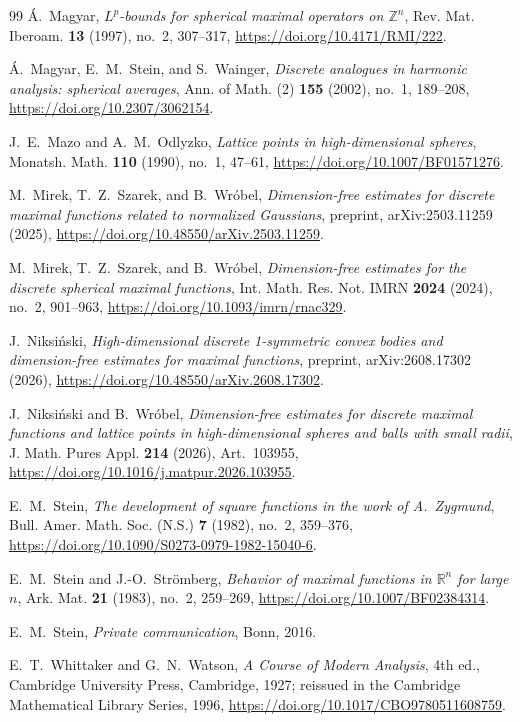 \documentclass{article}
\theoremstyle{plain}
\numberwithin{equation}{section}
\begin{document}
\begin{thebibliography}{99}
\'A.~Magyar,
\emph{$L^p$-bounds for spherical maximal operators on $\mathbb Z^n$},
Rev. Mat. Iberoam. \textbf{13} (1997), no.~2, 307--317,
\url{https://doi.org/10.4171/RMI/222}.

\'A.~Magyar, E.~M.~Stein, and S.~Wainger,
\emph{Discrete analogues in harmonic analysis: spherical averages},
Ann. of Math. (2) \textbf{155} (2002), no.~1, 189--208,
\url{https://doi.org/10.2307/3062154}.

J.~E.~Mazo and A.~M.~Odlyzko,
\emph{Lattice points in high-dimensional spheres},
Monatsh. Math. \textbf{110} (1990), no.~1, 47--61,
\url{https://doi.org/10.1007/BF01571276}.

M.~Mirek, T.~Z.~Szarek, and B.~Wr\'obel,
\emph{Dimension-free estimates for discrete maximal functions related to
normalized Gaussians},
preprint, arXiv:2503.11259 (2025),
\url{https://doi.org/10.48550/arXiv.2503.11259}.

M.~Mirek, T.~Z.~Szarek, and B.~Wr\'obel,
\emph{Dimension-free estimates for the discrete spherical maximal functions},
Int. Math. Res. Not. IMRN \textbf{2024} (2024), no.~2, 901--963,
\url{https://doi.org/10.1093/imrn/rnac329}.

J.~Niksi\'nski,
\emph{High-dimensional discrete 1-symmetric convex bodies and
dimension-free estimates for maximal functions},
preprint, arXiv:2608.17302 (2026),
\url{https://doi.org/10.48550/arXiv.2608.17302}.

J.~Niksi\'nski and B.~Wr\'obel,
\emph{Dimension-free estimates for discrete maximal functions and lattice
points in high-dimensional spheres and balls with small radii},
J. Math. Pures Appl. \textbf{214} (2026), Art.~103955,
\url{https://doi.org/10.1016/j.matpur.2026.103955}.

E.~M.~Stein,
\emph{The development of square functions in the work of A.~Zygmund},
Bull. Amer. Math. Soc. (N.S.) \textbf{7} (1982), no.~2, 359--376,
\url{https://doi.org/10.1090/S0273-0979-1982-15040-6}.

E.~M.~Stein and J.-O.~Str\"omberg,
\emph{Behavior of maximal functions in $\mathbb R^n$ for large $n$},
Ark. Mat. \textbf{21} (1983), no.~2, 259--269,
\url{https://doi.org/10.1007/BF02384314}.

E.~M.~Stein,
\emph{Private communication}, Bonn, 2016.

E.~T.~Whittaker and G.~N.~Watson,
\emph{A Course of Modern Analysis}, 4th ed.,
Cambridge University Press, Cambridge, 1927;
reissued in the Cambridge Mathematical Library Series, 1996,
\url{https://doi.org/10.1017/CBO9780511608759}.

\end{thebibliography}
\end{document}
